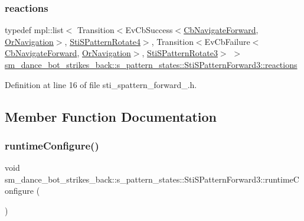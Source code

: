 \subsubsection{\texorpdfstring{reactions}{reactions}}
{\footnotesize\ttfamily typedef mpl\+::list$<$ Transition$<$Ev\+Cb\+Success$<$\hyperlink{classcl__move__base__z_1_1CbNavigateForward}{Cb\+Navigate\+Forward}, \hyperlink{classsm__dance__bot__strikes__back_1_1OrNavigation}{Or\+Navigation}$>$, \hyperlink{structsm__dance__bot__strikes__back_1_1s__pattern__states_1_1StiSPatternRotate4}{Sti\+S\+Pattern\+Rotate4}$>$, Transition$<$Ev\+Cb\+Failure$<$\hyperlink{classcl__move__base__z_1_1CbNavigateForward}{Cb\+Navigate\+Forward}, \hyperlink{classsm__dance__bot__strikes__back_1_1OrNavigation}{Or\+Navigation}$>$, \hyperlink{structsm__dance__bot__strikes__back_1_1s__pattern__states_1_1StiSPatternRotate3}{Sti\+S\+Pattern\+Rotate3}$>$ $>$ \hyperlink{structsm__dance__bot__strikes__back_1_1s__pattern__states_1_1StiSPatternForward3_a34498ac898517892b5f26c22785a55d1}{sm\+\_\+dance\+\_\+bot\+\_\+strikes\+\_\+back\+::s\+\_\+pattern\+\_\+states\+::\+Sti\+S\+Pattern\+Forward3\+::reactions}}



Definition at line 16 of file sti\+\_\+spattern\+\_\+forward\+\_.\+h.



\subsection{Member Function Documentation}
\mbox{\label{structsm__dance__bot__strikes__back_1_1s__pattern__states_1_1StiSPatternForward3_ae13b44410a66288bc5489b9d6b1d4f1a}} 
\subsubsection{\texorpdfstring{runtime\+Configure()}{runtimeConfigure()}}
{\footnotesize\ttfamily void sm\+\_\+dance\+\_\+bot\+\_\+strikes\+\_\+back\+::s\+\_\+pattern\+\_\+states\+::\+Sti\+S\+Pattern\+Forward3\+::runtime\+Configure (\begin{DoxyParamCaption}{ }\end{DoxyParamCaption})\hspace{0.3cm}{\ttfamily [inline]}}



